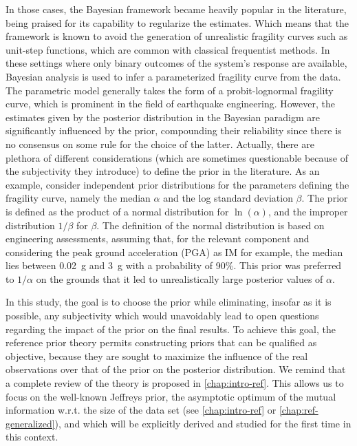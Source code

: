 In those cases, the Bayesian framework became heavily popular in the literature, being praised for its capability to regularize the estimates. Which means that the framework is known to
avoid the generation of unrealistic fragility curves such as unit-step functions, which are common with
 classical frequentist methods.  %
In these settings where only binary outcomes %
of the system's response are available, Bayesian analysis is used to infer a parameterized fragility curve from the data. The
parametric model generally takes the form of a probit-lognormal fragility curve, which is prominent in the field of earthquake engineering.
%
%
However, the estimates given by the posterior distribution in the  Bayesian paradigm %
are significantly influenced by the prior, 
compounding their reliability since there is no consensus on some rule for the choice of the latter.
Actually,
there are plethora of different considerations (which are sometimes questionable because of the subjectivity they introduce) to define the prior in the literature.
As an example, \citet{straub_improved_2008}
consider independent prior distributions for the parameters defining the fragility curve, namely the median $\alpha$ and the log standard deviation $\beta$. The prior is defined as the product of a normal distribution for $\ln(\alpha)$, and the improper distribution $1/\beta$ for $\beta$. The definition of the normal distribution is based on engineering assessments, assuming that, for the relevant component and considering the peak ground acceleration (PGA) as IM for example, the median lies between 0.02~g and 3~g with a probability of 90\%. This prior was preferred to $1/\alpha$ on the grounds that it led to unrealistically large posterior values of $\alpha$.



In this study, the goal is to choose the prior while eliminating, insofar as it is possible, any subjectivity which would unavoidably lead to open questions regarding the impact of the prior on the final results. %
To achieve this goal, the reference prior theory permits constructing priors that can be qualified as objective, because they are sought to maximize the influence of the real observations over that of the prior on the posterior distribution.
We remind that a complete review of the theory is proposed in \cref{chap:intro-ref}.
This allows us to focus on the well-known Jeffreys prior, the asymptotic optimum of the mutual information w.r.t. the size of the data set (see \cref{chap:intro-ref} or \cref{chap:ref-generalized}), and which will be explicitly derived and studied for the first time in this context. 

